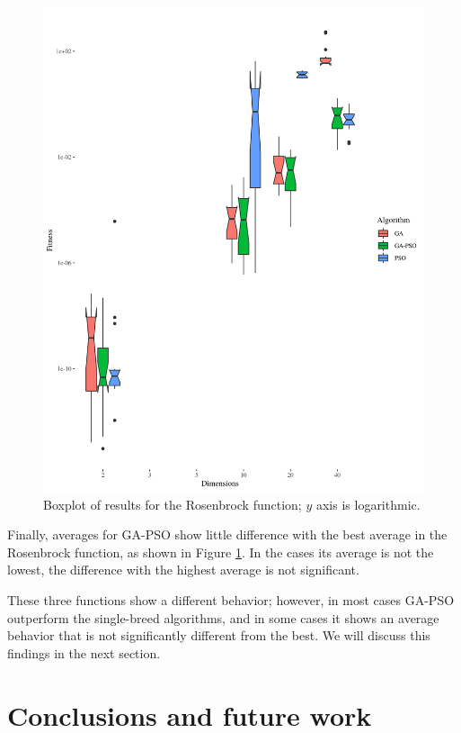 \documentclass[runningheads]{llncs}
\begin{document}
\begin{figure}[h!tb]
  \centering
  \includegraphics[height=0.4\textheight]{img/rosenbrock-boxplot.png}
  \caption{Boxplot of results for the Rosenbrock function; $y$ axis is logarithmic.\label{fig:boxplot:rosenbrock}}
\end{figure}
%

Finally, averages for GA-PSO show little difference with the best
average in the Rosenbrock function, as shown in Figure
\ref{fig:boxplot:rosenbrock}. In the cases its average is not the
lowest, the difference with the highest average is not significant.

These three functions show a different behavior; however, in most
cases GA-PSO outperform the single-breed algorithms, and in some cases
it shows an average behavior that is not significantly different from
the best. We will discuss this findings in the next section.

\section{Conclusions and future work}
\end{document}
